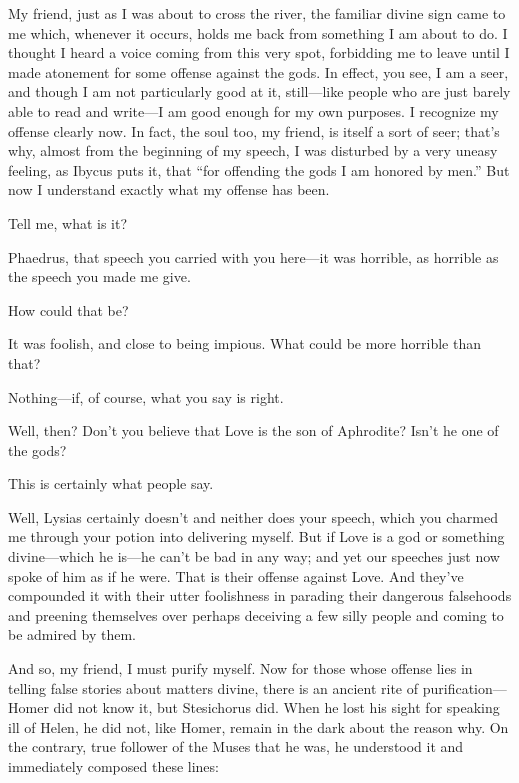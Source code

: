 \saysocrates My friend, just as I was about to cross the river, the
familiar divine sign came to me which, whenever it occurs, holds
me back from something I am about to do. I thought I heard a voice
coming from this very spot, forbidding me to leave until I made
atonement for some offense against the gods. In effect, you see, I am a
seer, and though I am not particularly good at it, still---like people
who are just barely able to read and write---I am good enough for my own
purposes. I recognize my offense clearly now. In fact, the soul too, my
friend, is itself a sort of seer; that's why, almost from the beginning
of my speech, I was disturbed by a very uneasy feeling, as
Ibycus puts it, that “for offending the gods I am honored by
men.” But now I
understand exactly what my offense has been.

\sayphaedrus Tell me, what is it?

\saysocrates Phaedrus, that speech you carried with you here---it was
horrible, as horrible as the speech you made me give.

\sayphaedrus How could that be?

\saysocrates It was foolish, and close to being impious. What could be more
horrible than that?

\sayphaedrus Nothing---if, of course, what you say is right.

\saysocrates Well, then? Don't you believe that Love is the son of
Aphrodite? Isn't he one of the gods?

\sayphaedrus This is certainly what people say.

\saysocrates Well, Lysias certainly doesn't and neither does your speech,
which you charmed me through your potion into delivering myself. But if
Love is a god or something divine---which he is---he can't be bad in 
any way; and yet our speeches just now spoke of him as if he
were. That is their offense against Love. And they've compounded it with
their utter foolishness in parading their dangerous falsehoods and
preening themselves over perhaps deceiving a few silly
people and coming to be admired by them.

And so, my friend, I must purify myself. Now for those whose offense
lies in telling false stories about matters divine, there is an ancient
rite of purification---Homer did not know it, but Stesichorus did. When
he lost his sight for speaking ill of Helen, he did not, like Homer,
remain in the dark about the reason why. On the contrary, true follower
of the Muses that he was, he understood it and immediately composed
these lines:\crlf
\crlf

